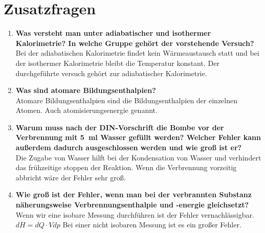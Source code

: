 \section{Zusatzfragen}
	\begin{enumerate}
		\item \textbf{ Was versteht man unter adiabatischer und isothermer Kalorimetrie? In welche Gruppe gehört der  vorstehende Versuch?} \\
		Bei der adiabatischen Kalorimetrie findet kein Wärmeaustausch statt und bei der isothermer Kalorimetrie bleibt die Temperatur konstant. 
		Der durchgeführte versuch gehört zur adiabatischer Kalorimetrie. 
	
		\item \textbf{ Was sind atomare Bildungsenthalpien?}\\
		Atomare Bildungsenthalpien sind die Bildungsenthalpien der einzelnen Atomen. Auch atomisierungsenergie genannt.
		\item \textbf{ Warum muss nach der DIN-Vorschrift die Bombe vor der Verbrennung mit 5\ ml Wasser gefüllt werden? Welcher Fehler kann außerdem dadurch ausgeschlossen werden und wie groß ist er?}\\
		Die Zugabe von Wasser hilft bei der Kondensation von Wasser und verhindert das frühzeitige stoppen der Reaktion. Wenn die Verbrennung vorzeitig abbricht wäre der Fehler sehr groß.   
		\item  \textbf{ Wie groß ist der Fehler, wenn man bei der verbrannten Substanz näherungsweise Verbrennungsenthalpie und -energie gleichsetzt?}\\
		Wenn wir eine isobare Messung durchführen ist der Fehler vernachlässigbar.
		$dH = dQ \cdot Vdp$
		Bei einer nicht isobaren Messung ist es ein großer Fehler.
	\end{enumerate}
